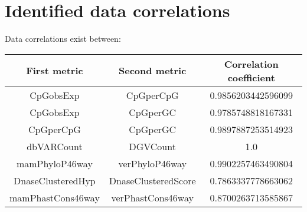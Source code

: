 \documentclass[\main/main.tex]{subfiles}
\begin{document}
\section{Identified data correlations}
Data correlations exist between:

\begin{table}
  \begin{tabular}{|c|c|c|}
    \hline
    \textbf{First metric} & \textbf{Second metric} & \textbf{Correlation coefficient} \\
    \hline
    CpGobsExp             & CpGperCpG              & 0.9856203442596099               \\
    \hline
    CpGobsExp             & CpGperGC               & 0.9785748818167331               \\
    \hline
    CpGperCpG             & CpGperGC               & 0.9897887253514923               \\
    \hline
    dbVARCount            & DGVCount               & 1.0                              \\
    \hline
    mamPhyloP46way        & verPhyloP46way         & 0.9902257463490804               \\
    \hline
    DnaseClusteredHyp     & DnaseClusteredScore    & 0.7863337778663062               \\
    \hline
    mamPhastCons46way     & verPhastCons46way      & 0.8700263713585867               \\
    \hline
  \end{tabular}
\end{table}
\end{document}
